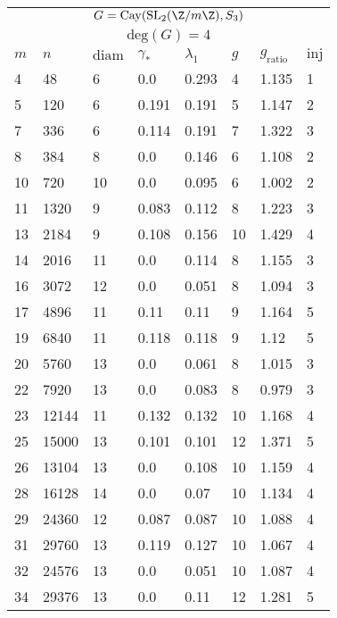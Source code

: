 \vspace{2em}

\begin{center}
	\begin{tabular}{ p{1cm}|p{1cm}|p{1cm}|p{1cm}|p{1cm}|p{1cm}|p{1cm}|p{1cm} }
		\multicolumn{8}{c}{$G = \mathrm{Cay}(\mathrm{SL}_2(\Z/m\Z),S_3)$} \\
		\multicolumn{8}{c}{$\mathrm{deg}(G) = 4$} \\
		\hline
		$m$ & $n$ &  $\mathrm{diam}$ & $\gamma_*$ &  $\lambda_1$ & $g$ & $g_{\mathrm{ratio}}$ & $\mathrm{inj}$     \\
		\hline
		4 & 48 & 6 &  0.0 & 0.293 & 4 & 1.135 & 1 \\
		5 & 120 & 6 &  0.191 & 0.191 & 5 & 1.147 & 2 \\
		7 & 336 & 6 &  0.114 & 0.191 & 7 & 1.322 & 3 \\
		8 & 384 & 8 &  0.0 & 0.146 & 6 & 1.108 & 2 \\
		10 & 720 & 10 &  0.0 & 0.095 & 6 & 1.002 & 2 \\
		11 & 1320 & 9 &  0.083 & 0.112 & 8 & 1.223 & 3 \\
		13 & 2184 & 9 &  0.108 & 0.156 & 10 & 1.429 & 4 \\
		14 & 2016 & 11 &  0.0 & 0.114 & 8 & 1.155 & 3 \\
		16 & 3072 & 12 &  0.0 & 0.051 & 8 & 1.094 & 3 \\
		17 & 4896 & 11 &  0.11 & 0.11 & 9 & 1.164 & 5 \\
		19 & 6840 & 11 &  0.118 & 0.118 & 9 & 1.12 & 5 \\
		20 & 5760 & 13 &  0.0 & 0.061 & 8 & 1.015 & 3 \\
		22 & 7920 & 13 &  0.0 & 0.083 & 8 & 0.979 & 3 \\
		23 & 12144 & 11 &  0.132 & 0.132 & 10 & 1.168 & 4 \\
		25 & 15000 & 13 &  0.101 & 0.101 & 12 & 1.371 & 5 \\
		26 & 13104 & 13 &  0.0 & 0.108 & 10 & 1.159 & 4 \\
		28 & 16128 & 14 &  0.0 & 0.07 & 10 & 1.134 & 4 \\
		29 & 24360 & 12 &  0.087 & 0.087 & 10 & 1.088 & 4 \\
		31 & 29760 & 13 &  0.119 & 0.127 & 10 & 1.067 & 4 \\
		32 & 24576 & 13 &  0.0 & 0.051 & 10 & 1.087 & 4 \\
		34 & 29376 & 13 &  0.0 & 0.11 & 12 & 1.281 & 5 
	\end{tabular}
\end{center}

